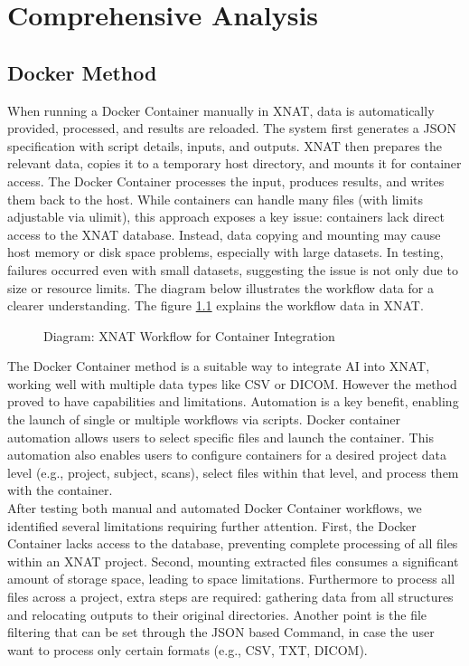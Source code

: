 \chapter{Comprehensive Analysis}
\section{Docker Method}

When running a Docker Container manually in XNAT, data is automatically provided, processed, and results are reloaded. The system first generates a JSON specification with script details, inputs, and outputs. XNAT then prepares the relevant data, copies it to a temporary host directory, and mounts it for container access. The Docker Container processes the input, produces results, and writes them back to the host.
While containers can handle many files (with limits adjustable via ulimit), this approach exposes a key issue: containers lack direct access to the XNAT database. Instead, data copying and mounting may cause host memory or disk space problems, especially with large datasets. In testing, failures occurred even with small datasets, suggesting the issue is not only due to size or resource limits.
The diagram below illustrates the workflow data for a clearer understanding.  
The figure \ref{fig:workflow} explains the workflow data in XNAT.

\begin{figure}[H]
    \centering
    \def\svgwidth{\linewidth} 
    
    \caption{Diagram: XNAT Workflow for Container Integration}
    \label{fig:workflow}
\end{figure}



The Docker Container method is a suitable way to integrate AI into XNAT, working well with multiple data types like CSV or DICOM. However the method proved to have capabilities and limitations.
Automation is a key benefit, enabling the launch of single or multiple workflows via scripts. Docker container automation allows users to select specific files and launch the container. This automation also enables users to configure containers for a desired project data level (e.g., project, subject, scans), select files within that level, and process them with the container. \\

After testing both manual and automated Docker Container workflows, we identified several limitations requiring further attention. First, the Docker Container lacks access to the database, preventing complete processing of all files within an XNAT project. Second, mounting extracted files consumes a significant amount of storage space, leading to space limitations.
Furthermore to process all files across a project, extra steps are required: gathering data from all structures and relocating outputs to their original directories.
Another point is the file filtering that can be set through the JSON based Command, in case the user want to process only certain formats (e.g., CSV, TXT, DICOM).

